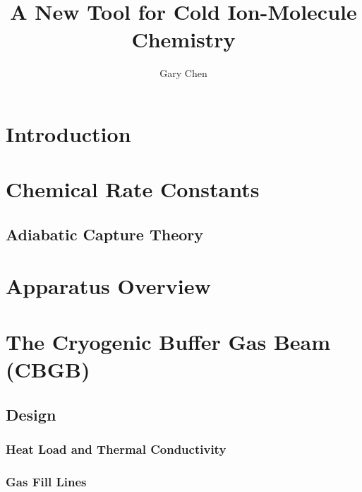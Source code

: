 \documentclass [PhD,nolistoftables,scheader] {uclathes}
\title          {A New Tool for Cold Ion-Molecule Chemistry}
\author         {Gary Chen}
\begin{document}
\makeintropages


\chapter{Introduction}
	
	
%	
	
\chapter{Chemical Rate Constants}
	
	
	\section{Adiabatic Capture Theory}
	

%	

\chapter{Apparatus Overview}


\chapter{The Cryogenic Buffer Gas Beam (CBGB)}


	\section{Design}
	
	
		\subsection{Heat Load and Thermal Conductivity}
		
		
		\subsection{Gas Fill Lines}
		
	
\end{document}
